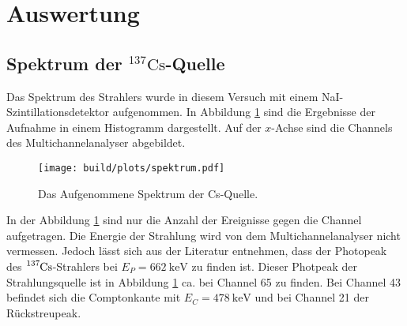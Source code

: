 \newpage 
\section{Auswertung}

  \subsection{Spektrum der $^{137}\text{Cs}$-Quelle}
    Das Spektrum des Strahlers wurde in diesem Versuch mit einem NaI-Szintillationsdetektor aufgenommen. 
    In Abbildung \ref{fig:Spektrum} sind die Ergebnisse der Aufnahme in einem Histogramm dargestellt. Auf der $x$-Achse sind die Channels des Multichannelanalyser abgebildet.
    \begin{figure}[H]
      \centering  
      \texttt{[image: build/plots/spektrum.pdf]}
      \label{fig:Spektrum}
      \caption{Das Aufgenommene Spektrum der Cs-Quelle.}
    \end{figure}

    \noindent In der Abbildung \ref{fig:Spektrum} sind nur die Anzahl der Ereignisse gegen die Channel aufgetragen. 
    Die Energie der Strahlung wird von dem Multichannelanalyser nicht vermessen. 
    Jedoch lässt sich aus der Literatur \cite{Peak} entnehmen, dass der Photopeak des $\ce{^{137}Cs}$-Strahlers bei $E_P = \SI{662}{\kilo\electronvolt}$ zu finden ist.
    Dieser Photpeak der Strahlungsquelle ist in Abbildung \ref{fig:Spektrum} ca. bei Channel 65 zu finden. 
    Bei Channel 43 befindet sich die Comptonkante mit $E_C = \SI{478}{\kilo\electronvolt}$ und bei Channel 21 der Rückstreupeak.


